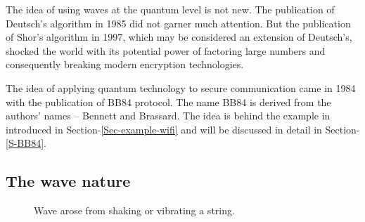 \documentclass[oneside, letter, 12pt]{book}
\begin{document}
The idea of using waves at the quantum level is not new. The publication of Deutsch's algorithm\cite{1985Deutsch} in 1985 did not garner much attention. But the publication of Shor's algorithm in 1997, which may be considered an extension of Deutsch's, shocked the world with its potential power of factoring large numbers and consequently breaking modern encryption technologies.

The idea of applying quantum technology to secure communication came in 1984 with the publication of BB84 protocol\cite{1997Shor}. The name BB84 is derived from the authors' names -- Bennett and Brassard. The idea is behind the example in introduced in Section-\ref{Sec-example-wifi} and will be discussed in detail in Section-\ref{S-BB84}.

\subsection{The wave nature}
\begin{figure}[h]\label{String}
\caption{Wave arose from shaking or vibrating a string.}
\end{figure}
\end{document}
